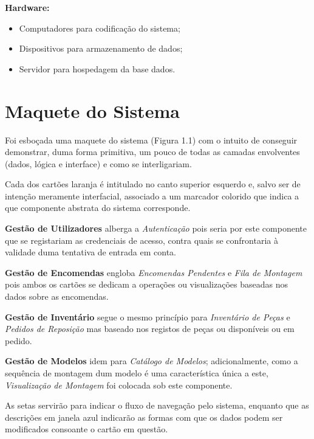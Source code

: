         \textbf{Hardware:}
        \begin{itemize}
            \item Computadores para codificação do sistema;
            \item Dispositivos para armazenamento de dados;
            \item Servidor para hospedagem da base dados.
        \end{itemize}
    
    \newpage            
    \section{Maquete do Sistema}

        Foi esboçada uma maquete do sistema (Figura 1.1) com o intuito de conseguir demonstrar, duma forma primitiva, um pouco de todas as camadas envolventes (dados, lógica e interface) e como se interligariam.
        
        Cada dos cartões laranja é intitulado no canto superior esquerdo e, salvo ser de intenção meramente interfacial, associado a um marcador colorido que indica a que componente abstrata do sistema corresponde.

        \textbf{Gestão de Utilizadores} alberga a \textit{Autenticação} pois seria por este componente que se registariam as credenciais de acesso, contra quais se confrontaria à validade duma tentativa de entrada em conta.

        \textbf{Gestão de Encomendas} engloba \textit{Encomendas Pendentes} e \textit{Fila de Montagem} pois ambos os cartões se dedicam a operações ou visualizações baseadas nos dados sobre as encomendas.

        \textbf{Gestão de Inventário} segue o mesmo princípio para \textit{Inventário de Peças} e \textit{Pedidos de Reposição} mas baseado nos registos de peças ou disponíveis ou em pedido.

        \textbf{Gestão de Modelos} idem para \textit{Catálogo de Modelos}; adicionalmente, como a sequência de montagem dum modelo é uma característica única a este, \textit{Visualização de Montagem} foi colocada sob este componente.

        As setas servirão para indicar o fluxo de navegação pelo sistema, enquanto que as descrições em janela azul indicarão as formas com que os dados podem ser modificados consoante o cartão em questão.
        
